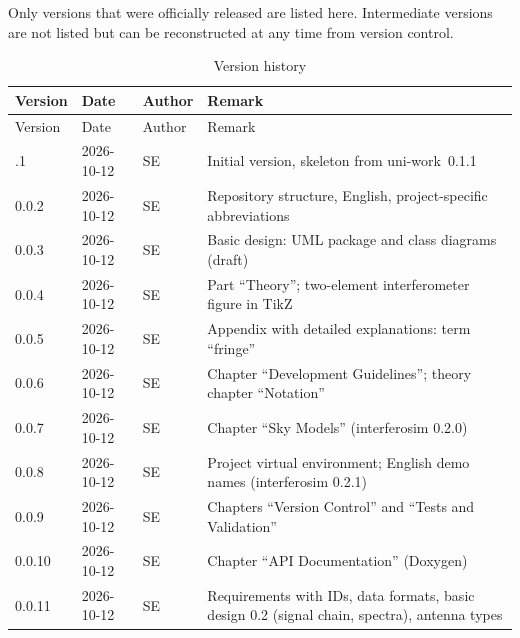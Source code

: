 \id


Only versions that were officially released are listed here.
Intermediate versions are not listed but can be reconstructed at any
time from version control.


{\normalsize
\begin{longtable}{ll l >{\raggedright\arraybackslash}p{8.4cm}}
\caption{Version history}\label{tab:history} \\
    \hline
    Version & Date & Author & Remark \\
    \hline
\endfirsthead
    \hline
    Version & Date & Author & Remark \\
    \hline
\endhead
    \hline
\endfoot
    0.0.1 & 2026-10-12 & SE & Initial version, skeleton from uni-work~0.1.1 \\
    0.0.2 & 2026-10-12 & SE & Repository structure, English, project-specific abbreviations \\
    0.0.3 & 2026-10-12 & SE & Basic design: UML package and class diagrams (draft) \\
    0.0.4 & 2026-10-12 & SE & Part \enquote{Theory}; two-element interferometer figure in TikZ \\
    0.0.5 & 2026-10-12 & SE & Appendix with detailed explanations: term \enquote{fringe} \\
    0.0.6 & 2026-10-12 & SE & Chapter \enquote{Development Guidelines}; theory chapter \enquote{Notation} \\
    0.0.7 & 2026-10-12 & SE & Chapter \enquote{Sky Models} (interferosim 0.2.0) \\
    0.0.8 & 2026-10-12 & SE & Project virtual environment; English demo names (interferosim 0.2.1) \\
    0.0.9 & 2026-10-12 & SE & Chapters \enquote{Version Control} and \enquote{Tests and Validation} \\
    0.0.10 & 2026-10-12 & SE & Chapter \enquote{API Documentation} (Doxygen) \\
    0.0.11 & 2026-10-12 & SE & Requirements with IDs, data formats, basic design 0.2 (signal chain, spectra), antenna types \\

\end{longtable}}
